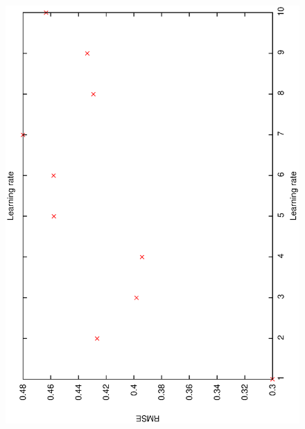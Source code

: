 \documentclass[12pt,a4,notitlepage]{report}
\renewcommand{\_}{\texttt{\symbol{95}}}
\newcommand{\<}{\texttt{\symbol{60}}}
\renewcommand{\>}{\texttt{\symbol{62}}}
\begin{document}
\begin{figure}
\includegraphics[scale=0.3,angle=-90]{results/neural_err/n_learning_rate.ps}

\end{figure}
\end{document}
